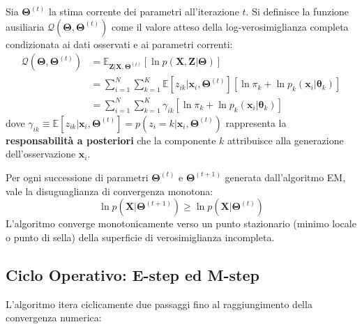 Sia $\boldsymbol{\Theta}^{(t)}$ la stima corrente dei parametri all'iterazione $t$. Si definisce la funzione ausiliaria $\mathcal{Q}(\boldsymbol{\Theta}, \boldsymbol{\Theta}^{(t)})$ come il valore atteso della log-verosimiglianza completa condizionata ai dati osservati e ai parametri correnti:
\begin{align}
\label{eq:dm-q-function}
\mathcal{Q}(\boldsymbol{\Theta}, \boldsymbol{\Theta}^{(t)}) &= \mathbb{E}_{\mathbf{Z} | \mathbf{X}, \boldsymbol{\Theta}^{(t)}} \left[ \ln p(\mathbf{X}, \mathbf{Z} | \boldsymbol{\Theta}) \right] \nonumber \\
&= \sum_{i=1}^N \sum_{k=1}^K \mathbb{E}[z_{ik} | \mathbf{x}_i, \boldsymbol{\Theta}^{(t)}] \left[ \ln \pi_k + \ln p_k(\mathbf{x}_i | \boldsymbol{\theta}_k) \right] \nonumber \\
&= \sum_{i=1}^N \sum_{k=1}^K \gamma_{ik} \left[ \ln \pi_k + \ln p_k(\mathbf{x}_i | \boldsymbol{\theta}_k) \right]
\end{align}
dove $\gamma_{ik} \equiv \mathbb{E}[z_{ik} | \mathbf{x}_i, \boldsymbol{\Theta}^{(t)}] = p(z_i = k | \mathbf{x}_i, \boldsymbol{\Theta}^{(t)})$ rappresenta la \textbf{responsabilità a posteriori} che la componente $k$ attribuisce alla generazione dell'osservazione $\mathbf{x}_i$.

\begin{theorem}
Per ogni successione di parametri $\boldsymbol{\Theta}^{(t)}$ e $\boldsymbol{\Theta}^{(t+1)}$ generata dall'algoritmo EM, vale la disuguaglianza di convergenza monotona:
\begin{equation}
\ln p(\mathbf{X} | \boldsymbol{\Theta}^{(t+1)}) \ge \ln p(\mathbf{X} | \boldsymbol{\Theta}^{(t)})
\end{equation}
L'algoritmo converge monotonicamente verso un punto stazionario (minimo locale o punto di sella) della superficie di verosimiglianza incompleta.
\end{theorem}

\FloatBarrier
\subsection{Ciclo Operativo: E-step ed M-step}

L'algoritmo itera ciclicamente due passaggi fino al raggiungimento della convergenza numerica:

